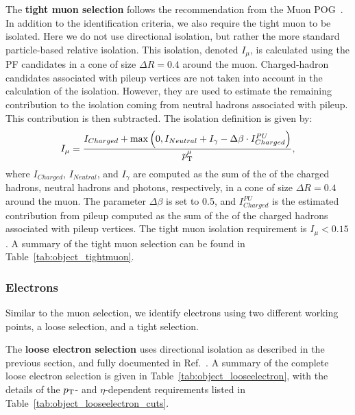 The \textbf{tight muon selection} follows the recommendation from the Muon POG~\cite{MuonID}.
In addition to the identification criteria, we also require the tight muon to be isolated. 
Here we do not use directional isolation, but rather the more standard particle-based relative
isolation. 
This isolation, denoted $I_\mu$, is calculated using the PF candidates in a cone of size $\Delta R =
0.4$ around the muon. Charged-hadron candidates associated with pileup vertices are not taken into
account in the calculation of the isolation. However, they are used to estimate the remaining
contribution to the isolation coming from neutral hadrons associated with pileup. This contribution
is then subtracted. 
The isolation definition is given by:
\begin{equation}
I_\mu = \frac{I_{Charged} + \max\left(0, I_{Neutral} + I_{\gamma} - \Delta\beta\cdot
I_{Charged}^{PU}\right)}
             {p_{\mathrm{T}}^\mu} , 
\label{eqn:iso}
\end{equation}
where $I_{Charged}$, $I_{Neutral}$, and $I_{\gamma}$ are computed as the sum of the \pt of the
charged hadrons, neutral hadrons and photons, respectively, in a cone of size $\Delta R = 0.4$
around the muon. The parameter $\Delta\beta$ is set to 0.5, and $I_{Charged}^{PU}$ is the estimated
contribution from pileup computed as the sum of the \pt of the charged hadrons associated with
pileup vertices.
The tight muon isolation requirement is $I_\mu < 0.15$.
A summary of the tight muon selection can be found in Table~\ref{tab:object_tightmuon}. 



 


\subsubsection{Electrons \label{sec:object_electron}}

Similar to the muon selection, we identify electrons using two different working points, a loose
selection, and a tight selection. 

The \textbf{loose electron selection} uses directional isolation as described in the previous
section, and fully documented in Ref.~\cite{CMS-AN2011-498}. A summary of the complete
loose electron selection is given in Table~\ref{tab:object_looseelectron}, with the details of
the $p_{\mathrm{T}}$- and $\eta$-dependent requirements listed in Table~\ref{tab:object_looseelectron_cuts}. 

